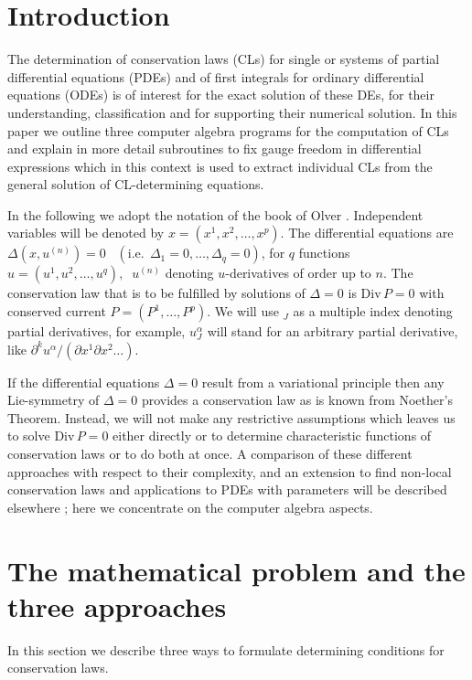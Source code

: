 \section{Introduction}
The determination of conservation laws (CLs) for single or systems of
partial differential equations (PDEs) and of first integrals for ordinary
differential equations (ODEs) is of interest for the exact solution
of these DEs, for their understanding, classification and for supporting
their numerical solution. In this paper we outline three computer
algebra programs for the computation of CLs and explain
in more detail subroutines to fix gauge freedom in differential
expressions which in this context is used to extract individual CLs
from the general solution of CL-determining equations.

In the following we adopt the notation of the book of Olver \cite{PO}.
Independent variables will be denoted by $x = (x^1, x^2, \ldots , x^p)$.
The differential equations are $\Delta(x,u^{(n)}) = 0
\;\;\;(\mbox{i.e.}\;\, \Delta_1=0, \ldots , \Delta_q=0)$,
for $q$ functions $u = (u^1, u^2, \ldots , u^q),\;\; u^{(n)}$ denoting
$u$-derivatives of order up to $n.$ The conservation law that is to be
fulfilled by solutions of $\Delta = 0$ is $\mbox{Div}\,P = 0$ with conserved
current $P = (P^1, \ldots , P^p).$ We will use $_J$ as a multiple index
denoting partial derivatives, for example, $u^{\alpha}_{J}$ will stand for
an arbitrary partial derivative, like
$\partial^k u^{\alpha}/(\partial x^1\partial x^2\ldots)$.

If the differential equations $\Delta = 0$ result from a variational
principle then any Lie-symmetry of $\Delta = 0$ provides a conservation
law as is known from Noether's Theorem. Instead, we will not make
any restrictive assumptions which leaves us to solve $\mbox{Div}\,P = 0$
either directly or to determine characteristic functions of conservation
laws or to do both at once. A comparison of these different approaches
with respect to their complexity, and an extension to find non-local
conservation laws and applications to PDEs with parameters will be
described elsewhere \cite{TW}; here we concentrate on the computer
algebra aspects.

\section{The mathematical problem and the three approaches}
In this section we describe three ways to formulate
determining conditions for conservation laws.

